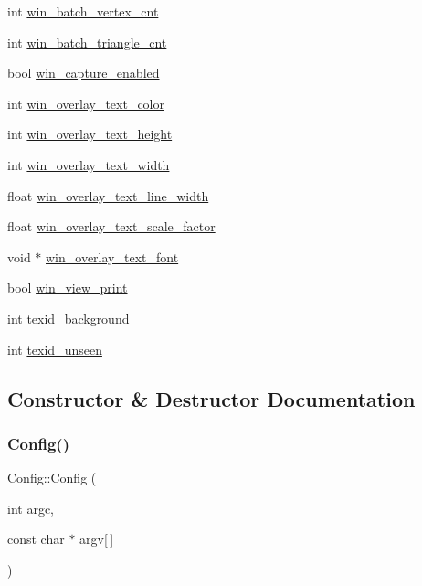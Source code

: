 \begin{DoxyCompactItemize}
\item 
int \mbox{\hyperlink{classConfig_a38c28f15216cce6540e7674a51fdd9f5}{win\+\_\+batch\+\_\+vertex\+\_\+cnt}}
\item 
int \mbox{\hyperlink{classConfig_ac79c2d639078b3b72342093c24d330b7}{win\+\_\+batch\+\_\+triangle\+\_\+cnt}}
\item 
bool \mbox{\hyperlink{classConfig_ad430f19c557221c335139cf5260f926f}{win\+\_\+capture\+\_\+enabled}}
\item 
int \mbox{\hyperlink{classConfig_a8545430bc00a2a13203a179fc93528a9}{win\+\_\+overlay\+\_\+text\+\_\+color}}
\item 
int \mbox{\hyperlink{classConfig_a268b3b52f45dd221eb58661ccb94c1e5}{win\+\_\+overlay\+\_\+text\+\_\+height}}
\item 
int \mbox{\hyperlink{classConfig_af5509578e215cc058f54d60cd7e8164e}{win\+\_\+overlay\+\_\+text\+\_\+width}}
\item 
float \mbox{\hyperlink{classConfig_a49787b874411539c9b4e9c6c21003a7c}{win\+\_\+overlay\+\_\+text\+\_\+line\+\_\+width}}
\item 
float \mbox{\hyperlink{classConfig_a011a62eea5192d8ff9e624f698ddcbdf}{win\+\_\+overlay\+\_\+text\+\_\+scale\+\_\+factor}}
\item 
void $\ast$ \mbox{\hyperlink{classConfig_a8a2762ed011ff2081255164315007ffb}{win\+\_\+overlay\+\_\+text\+\_\+font}}
\item 
bool \mbox{\hyperlink{classConfig_a875c1f62b9fcb9a3ca1ab3cc0e736d99}{win\+\_\+view\+\_\+print}}
\item 
int \mbox{\hyperlink{classConfig_a213d7e08ff9e2be07b8a3a052b9fae6f}{texid\+\_\+background}}
\item 
int \mbox{\hyperlink{classConfig_a2aa5131fa6d53dbdad9868ac67205589}{texid\+\_\+unseen}}
\end{DoxyCompactItemize}


\subsection{Constructor \& Destructor Documentation}
\mbox{\label{classConfig_a78cb21c58b4e4d3ffe4e2c1c580a6b33}} 
\subsubsection{\texorpdfstring{Config()}{Config()}}
{\footnotesize\ttfamily Config\+::\+Config (\begin{DoxyParamCaption}\item[{int}]{argc,  }\item[{const char $\ast$}]{argv\mbox{[}$\,$\mbox{]} }\end{DoxyParamCaption})}



